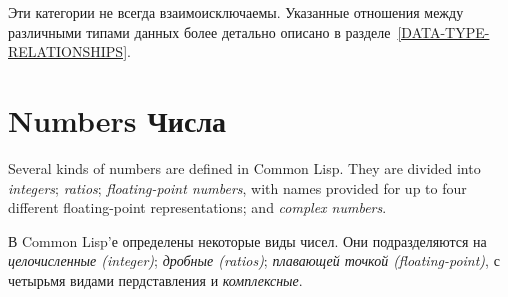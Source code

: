 Эти категории не всегда взаимоисключаемы. Указанные отношения
между различными типами данных более детально описано в
разделе~\ref{DATA-TYPE-RELATIONSHIPS}. 


\section{Numbers Числа}

Several kinds of numbers are defined in Common Lisp.
They are divided into {\it integers}; {\it ratios};
{\it floating-point numbers}, with names provided for
up to four different floating-point representations; and {\it complex numbers}.

В Common Lisp'е определены некоторые виды чисел. Они
подразделяются на {\it целочисленные (integer)}; {\it дробные
(ratios)}; {\it плавающей точкой (floating-point)}, с
четырьмя видами пердставления и {\it комплексные}.

